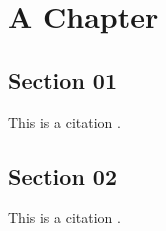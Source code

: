 \chapter{A Chapter}
\lipsum[1-3]
\section{Section 01}
This is a citation \cite{grand}.
\lipsum[2-5]

\section{Section 02}
This is a citation \cite{grand}.
\lipsum[2-3]